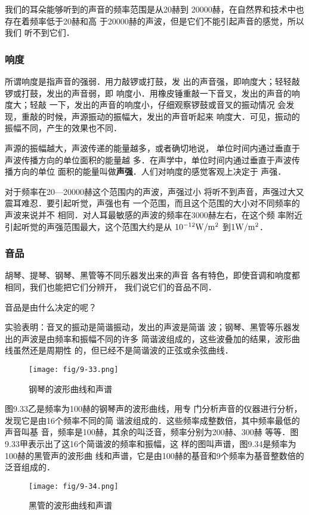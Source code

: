 我们的耳朵能够听到的声音的频率范围是从20赫到
20000赫，在自然界和技术中也存在着频率低于20赫和高
于20000赫的声波，但是它们不能引起声音的感觉，所以我们
听不到它们．


\subsubsection{响度}
所谓响度是指声音的强弱．用力敲锣或打鼓，发
出的声音强，即响度大；轻轻敲锣或打鼓，发出的声音弱，即
响度小．用橡皮锤重敲一下音叉，发出的声音的响度大；轻敲
一下，发出的声音的响度小，仔细观察锣鼓或音叉的振动情况
会发现，重敲的时候，声源振动的振幅大，发出的声音听起来
响度大．可见，振动的振幅不同，产生的效果也不同．

声源的振幅越大，声波传递的能量越多，或者确切地说，
单位时间内通过垂直于声波传播方向的单位面积的能量越
多．在声学中，单位时间内通过垂直于声波传播方向的单位
面积的能量叫做\textbf{声强}．人们对响度的感觉客观上决定于
声强．

对于频率在20—20000赫这个范围内的声波，声强过小
将听不到声音，声强过大又震耳难忍．要引起听觉，声强也有
一个范围，而且这个范围的大小对不同频率的声波来说并不
相同．对人耳最敏感的声波的频率在3000赫左右，在这个频
率附近引起听觉的声强范围最大，这个范围大约是从
$10^{-12}{\rm W}/{\rm m^2}$
到$1{\rm W}/{\rm m^2}$．

\subsubsection{音品}

胡琴、提琴、钢琴、黑管等不同乐器发出来的声音
各有特色，即使音调和响度都相同，我们也能把它们分辨开，
我们说它们的音品不同．

音品是由什么决定的呢？

实验表明：音叉的振动是简谐振动，发出的声波是简谐
波；钢琴、黑管等乐器发出的声波是由频率和振幅不同的许多
简谐波组成的，这些波叠加的结果，波形曲线虽然还是周期性
的，但已经不是简谐波的正弦或余弦曲线．
\begin{figure}[htp]\centering
    \texttt{[image: fig/9-33.png]}
    \caption{钢琴的波形曲线和声谱}
    \end{figure}

图9.33乙是频率为100赫的钢琴声的波形曲线，用专
门分析声音的仪器进行分析，发现它是由16个频率不同的简
谐波组成的．这些频率成整数倍，其中频率最低的声音叫基
音，频率是100赫，其余的叫泛音，频率分别为200赫、300赫
等等．图9.33甲表示出了这16个简谐波的频率和振幅，这
样的图叫声谱，图9.34是频率为100赫的黑管声的波形曲
线和声谱，它是由100赫的基音和9个频率为基音整数倍的
泛音组成的．
\begin{figure}[htp]\centering
    \texttt{[image: fig/9-34.png]}
    \caption{黑管的波形曲线和声谱}
    \end{figure}

